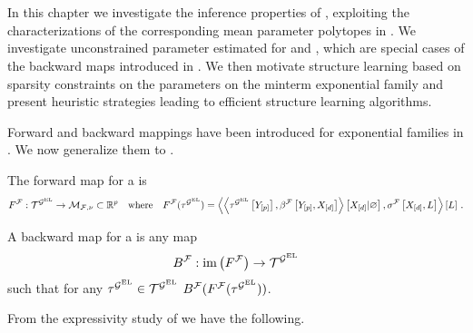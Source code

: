 \chapter{\chatextnetworkReasoning}\label{cha:networkReasoning}

In this chapter we investigate the inference properties of \HybridLogicNetworks{}, exploiting the characterizations of the corresponding mean parameter polytopes in .
We investigate unconstrained parameter estimated for \MarkovLogicNetworks{} and \HybridLogicNetworks{}, which are special cases of the backward maps introduced in .
We then motivate structure learning based on sparsity constraints on the parameters on the minterm exponential family and present heuristic strategies leading to efficient structure learning algorithms.





Forward and backward mappings have been introduced for exponential families in .
We now generalize them to \HybridLogicNetworks{}.

\begin{definition}

    The forward map for a \HybridLogicNetwork{} is
    \begin{align*}
         F^{\mathcal{F}} :  \mathcal{T}^{\mathcal{G}^{\mathrm{EL}}} \rightarrow \mathcal{M}_{\mathcal{F},\nu} \subset \mathbb{R}^{p}
         \quad \text{where} \quad
         F^{\mathcal{F}}(\tau^{\mathcal{G}^{\mathrm{EL}}})
         = \left\langle 
             \left\langle \tau^{\mathcal{G}^{\mathrm{EL}}}\left[Y_{[p]}\right],\beta^{\mathcal{F}}\left[Y_{[p]},X_{[d]}\right]\right\rangle \left[ X_{[d]} | \varnothing \right]
             ,\sigma^{\mathcal{F}}\left[X_{[d]},L\right]\right\rangle \left[ L \right] \, .
     \end{align*}

    A backward map for a \HybridLogicNetwork{} is any map
    \begin{align*}
         B^{\mathcal{F}} :  \mathrm{im}\left(F^{\mathcal{F}}\right) \rightarrow \mathcal{T}^{\mathcal{G}^{\mathrm{EL}}}
    \end{align*}
    such that for any $\tau^{\mathcal{G}^{\mathrm{EL}}}\in\mathcal{T}^{\mathcal{G}^{\mathrm{EL}}}$ $B^{\mathcal{F}}(F^{\mathcal{F}}(\tau^{\mathcal{G}^{\mathrm{EL}}}))$.

\end{definition}

From the expressivity study of  we have the following.

